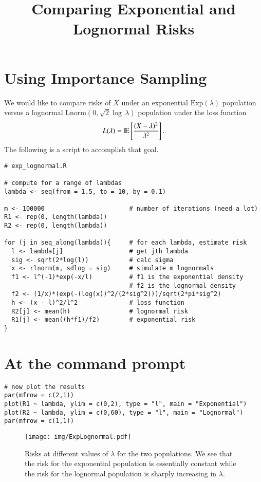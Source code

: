 \documentclass[11pt,english]{article}
\title{Comparing Exponential and Lognormal Risks}
\date{}
\begin{document}
\maketitle


\section*{Using Importance Sampling}
\label{sec-1}


We would like to compare risks of $X$ under an exponential $\mathrm{Exp}(\lambda)$ population versus a lognormal $\mathrm{Lnorm}(0,\sqrt{2}\log\,\lambda)$ population under the loss function
\[
L(\lambda) = \mathrm{I\hspace{-1.5pt}E} \left[\frac{(X - \lambda)^{2}}{\lambda^{2}}\right].
\]
The following is a script to accomplish that goal.
\begin{verbatim}
# exp_lognormal.R

# compute for a range of lambdas
lambda <- seq(from = 1.5, to = 10, by = 0.1)

m <- 100000                       # number of iterations (need a lot)
R1 <- rep(0, length(lambda))
R2 <- rep(0, length(lambda))

for (j in seq_along(lambda)){     # for each lambda, estimate risk
  l <- lambda[j]                  # get jth lambda
  sig <- sqrt(2*log(l))           # calc sigma
  x <- rlnorm(m, sdlog = sig)     # simulate m lognormals
  f1 <- l^(-1)*exp(-x/l)          # f1 is the exponential density
                                  # f2 is the lognormal density
  f2 <- (1/x)*(exp(-(log(x))^2/(2*sig^2)))/sqrt(2*pi*sig^2) 
  h <- (x - l)^2/l^2              # loss function
  R2[j] <- mean(h)                # lognormal risk
  R1[j] <- mean((h*f1)/f2)        # exponential risk
}
\end{verbatim}
\section*{At the command prompt}
\label{sec-2}


\begin{verbatim}
# now plot the results
par(mfrow = c(2,1))
plot(R1 ~ lambda, ylim = c(0,2), type = "l", main = "Exponential")
plot(R2 ~ lambda, ylim = c(0,60), type = "l", main = "Lognormal")
par(mfrow = c(1,1))
\end{verbatim}

\begin{figure}[h!]
\centering
\texttt{[image: img/ExpLognormal.pdf]}
\caption{\label{fig:yplot}Risks at different values of $\lambda$ for the two populations.  We see that the risk for the exponential population is essentially constant while the risk for the lognormal population is sharply increasing in $\lambda$.}
\end{figure}
\end{document}
